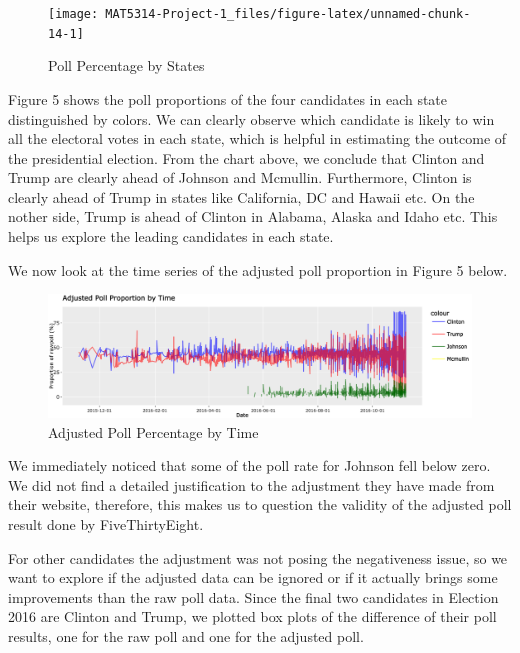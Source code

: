 \documentclass[
  11pt,
]{article}
\begin{document}
\begin{minipage}[t]{0.7\textwidth}
\begin{figure}
\texttt{[image: MAT5314-Project-1\_files/figure-latex/unnamed-chunk-14-1]} \caption{Poll Percentage by States}\label{fig:unnamed-chunk-14}
\end{figure}
\end{minipage}
\begin{minipage}[t]{0.3\textwidth}
\vspace{0pt}
Figure 5 shows the poll proportions of the four candidates in each state distinguished by colors. We can clearly observe which candidate is likely to win all the electoral votes in each state, which is helpful in estimating the outcome of the presidential election. From the chart above, we conclude that Clinton and Trump are clearly ahead of Johnson and Mcmullin. Furthermore, Clinton is clearly ahead of Trump in states like California, DC and Hawaii etc. On the nother side, Trump is ahead of Clinton in Alabama, Alaska and Idaho etc. This helps us explore the leading candidates in each state.
\end{minipage}

We now look at the time series of the adjusted poll proportion in Figure
5 below.

\begin{figure}
\centering
\includegraphics{./Figures/TsChart.png}
\caption{Adjusted Poll Percentage by Time}
\end{figure}

We immediately noticed that some of the poll rate for Johnson fell below
zero. We did not find a detailed justification to the adjustment they
have made from their website, therefore, this makes us to question the
validity of the adjusted poll result done by FiveThirtyEight.

For other candidates the adjustment was not posing the negativeness
issue, so we want to explore if the adjusted data can be ignored or if
it actually brings some improvements than the raw poll data. Since the
final two candidates in Election 2016 are Clinton and Trump, we plotted
box plots of the difference of their poll results, one for the raw poll
and one for the adjusted poll.
\end{document}
